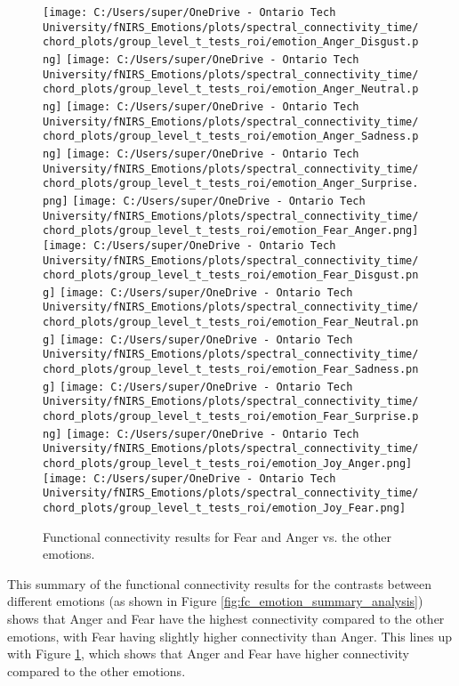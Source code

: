 \begin{figure}[H]
  \centering
  \texttt{[image: C:/Users/super/OneDrive - Ontario Tech University/fNIRS\_Emotions/plots/spectral\_connectivity\_time/chord\_plots/group\_level\_t\_tests\_roi/emotion\_Anger\_Disgust.png]}
  \texttt{[image: C:/Users/super/OneDrive - Ontario Tech University/fNIRS\_Emotions/plots/spectral\_connectivity\_time/chord\_plots/group\_level\_t\_tests\_roi/emotion\_Anger\_Neutral.png]}
  \texttt{[image: C:/Users/super/OneDrive - Ontario Tech University/fNIRS\_Emotions/plots/spectral\_connectivity\_time/chord\_plots/group\_level\_t\_tests\_roi/emotion\_Anger\_Sadness.png]}
  \texttt{[image: C:/Users/super/OneDrive - Ontario Tech University/fNIRS\_Emotions/plots/spectral\_connectivity\_time/chord\_plots/group\_level\_t\_tests\_roi/emotion\_Anger\_Surprise.png]}
  \texttt{[image: C:/Users/super/OneDrive - Ontario Tech University/fNIRS\_Emotions/plots/spectral\_connectivity\_time/chord\_plots/group\_level\_t\_tests\_roi/emotion\_Fear\_Anger.png]}
  \texttt{[image: C:/Users/super/OneDrive - Ontario Tech University/fNIRS\_Emotions/plots/spectral\_connectivity\_time/chord\_plots/group\_level\_t\_tests\_roi/emotion\_Fear\_Disgust.png]}
  \texttt{[image: C:/Users/super/OneDrive - Ontario Tech University/fNIRS\_Emotions/plots/spectral\_connectivity\_time/chord\_plots/group\_level\_t\_tests\_roi/emotion\_Fear\_Neutral.png]}
  \texttt{[image: C:/Users/super/OneDrive - Ontario Tech University/fNIRS\_Emotions/plots/spectral\_connectivity\_time/chord\_plots/group\_level\_t\_tests\_roi/emotion\_Fear\_Sadness.png]}
  \texttt{[image: C:/Users/super/OneDrive - Ontario Tech University/fNIRS\_Emotions/plots/spectral\_connectivity\_time/chord\_plots/group\_level\_t\_tests\_roi/emotion\_Fear\_Surprise.png]}
  \texttt{[image: C:/Users/super/OneDrive - Ontario Tech University/fNIRS\_Emotions/plots/spectral\_connectivity\_time/chord\_plots/group\_level\_t\_tests\_roi/emotion\_Joy\_Anger.png]}
  \texttt{[image: C:/Users/super/OneDrive - Ontario Tech University/fNIRS\_Emotions/plots/spectral\_connectivity\_time/chord\_plots/group\_level\_t\_tests\_roi/emotion\_Joy\_Fear.png]}
  \caption[FC: Emotion Contrasts (Fear and Anger)]{Functional connectivity results for Fear and Anger vs. the other emotions.}
  \label{fig:fc_emotion_analysis}
\end{figure}

This summary of the functional connectivity results for the contrasts between different emotions (as shown in Figure \ref{fig:fc_emotion_summary_analysis}) shows that Anger and Fear have the highest connectivity compared to the other emotions, with Fear having slightly higher connectivity than Anger.
This lines up with Figure \ref{fig:fc_emotion_analysis}, which shows that Anger and Fear have higher connectivity compared to the other emotions.

